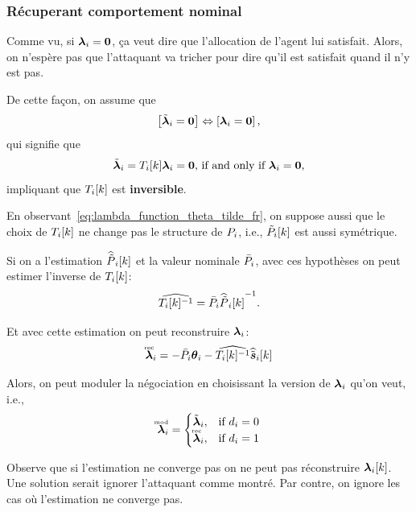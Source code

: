 \documentclass[../main.tex]{subfiles}
\begin{document}
\subsubsection{Récuperant comportement nominal}\label{sec:recov-nomin-behav_fr}
Comme vu, si $\boldsymbol{\lambda}_{i}=\mathbf{0}$, ça veut dire que l'allocation de l'agent lui satisfait.
Alors, on n'espère pas que l'attaquant va tricher pour dire qu'il est satisfait quand il n'y est pas.

De cette façon, on assume que
\begin{equation}
  \left[\tilde{\boldsymbol{\lambda}}_{i}=\mathbf{0} \right] \Leftrightarrow \left[\boldsymbol{\lambda}_{i}=\mathbf{0} \right],
\end{equation}
qui signifie que
\begin{equation}
  \label{eq:T_is_invertible}
  \tilde{\boldsymbol{\lambda}}_{i}=T_{i}[k]\boldsymbol{\lambda}_{i}=\mathbf{0}\text{, if and only if }\boldsymbol{\lambda}_{i}=\mathbf{0},
\end{equation}
impliquant que $T_{i}[k]$ est \textbf{inversible}.

En observant~\eqref{eq:lambda_function_theta_tilde_fr}, on suppose aussi que le choix de $T_{i}[k]$ ne change pas le structure de ${P}_{i}$, i.e., $\tilde{P}_{i}[k]$ est aussi symétrique.

Si on a l'estimation $\widehat{\tilde{P}}_{i}[k]$ et la valeur nominale $\bar{{P}}_{i}$, avec ces hypothèses on peut estimer l'inverse de $T_{i}[k]$:
\begin{equation}
  \label{eq:estimate_T_inverse}
{\widehat{T_{i}[k]^{-1}}=\bar{{P}}_{i}{\widehat{\tilde{P}}_{i}[k]}^{-1}}.
\end{equation}

Et avec cette estimation on peut reconstruire $\boldsymbol{\lambda}_{i}$:
\begin{equation}
  \label{eq:lambdareconstruction}
  \accentset{\text{rec}}{\boldsymbol{\lambda}}_{i}=-\bar{{P}}_{i}\boldsymbol{\theta}_{i}-\widehat{T_{i}[k]^{-1}}\widehat{\tilde{\boldsymbol{s}}}_{i}[k]
\end{equation}

Alors, on peut moduler la négociation en choisissant la version de $\boldsymbol{\lambda}_{i}$ qu'on veut, i.e.,
\begin{equation}
  \accentset{\text{mod}}{\boldsymbol{\lambda}}_{i}=
          \begin{cases}
            \tilde{\boldsymbol{\lambda}}_{i}, &\text{if } d_{i}=0\\
            \accentset{\text{rec}}{\boldsymbol{\lambda}}_{i}, &\text{if }d_{i}=1\\
        \end{cases}
\end{equation}

\begin{remark}
  Observe que si l'estimation ne converge pas on ne peut pas réconstruire $\lambdaik$.
  Une solution serait ignorer l'attaquant comme montré.
  Par contre, on ignore les cas où l'estimation ne converge pas.
\end{remark}
\end{document}
